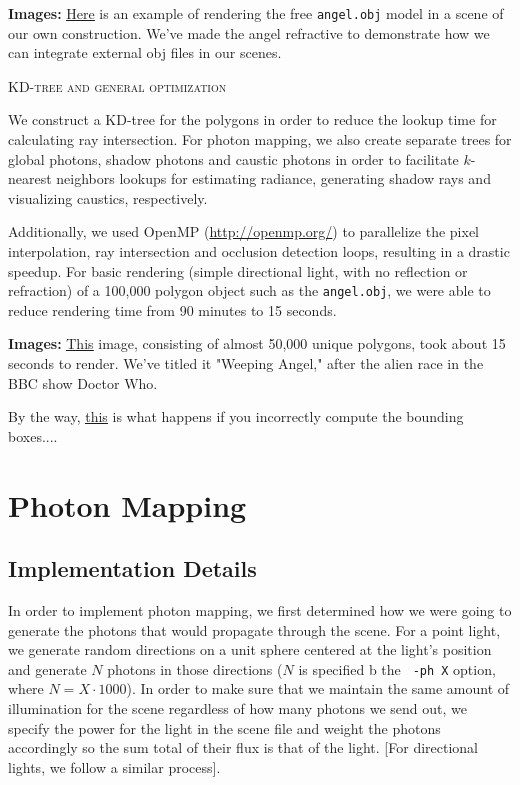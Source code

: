 \documentclass{article}
\begin{document}
\vspace{3mm}
{\bf Images:} \href{run://images/angel_ja3.png}{\underline{Here}} is an example of rendering the free \verb+angel.obj+ model in a scene of our own construction. We've made the angel refractive to demonstrate how we can integrate external obj files in our scenes.

\begin{center}\textsc{KD-tree and general optimization}\end{center} 
We construct a KD-tree for the polygons in order to reduce the lookup time for calculating ray intersection. For photon mapping, we also create separate trees for global photons, shadow photons and caustic photons in order to facilitate $k$-nearest neighbors lookups for estimating radiance, generating shadow rays and visualizing caustics, respectively.

Additionally, we used OpenMP (\url{http://openmp.org/}) to parallelize the pixel interpolation, ray intersection and occlusion detection loops, resulting in a drastic speedup. For basic rendering (simple directional light, with no reflection or refraction) of a 100,000 polygon object such as the \verb+angel.obj+, we were able to reduce rendering time from 90 minutes to 15 seconds.

\vspace{3mm}
{\bf Images:} \href{run://images/weepingangel.png}{\underline{This}} image, consisting of almost 50,000 unique polygons, took about 15 seconds to render. We've titled it "Weeping Angel," after the alien race in the BBC show Doctor Who.

By the way, \href{run://images/duude.png}{\underline{this}} is what happens if you incorrectly compute the bounding boxes....

\section{Photon Mapping} %
\label{sec:photon_mapping}

\subsection{Implementation Details} %
\label{sub:implementation_details}
In order to implement photon mapping, we first determined how we were going to generate the photons that would propagate through the scene. For a point light, we generate random directions on a unit sphere centered at the light's position and generate $N$ photons in those directions ($N$ is specified b the \verb+ -ph X+ option, where $N = X \cdot 1000$). In order to make sure that we maintain the same amount of illumination for the scene regardless of how many photons we send out, we specify the power for the light in the scene file and weight the photons accordingly so the sum total of their flux is that of the light. [For directional lights, we follow a similar process].
\end{document}
